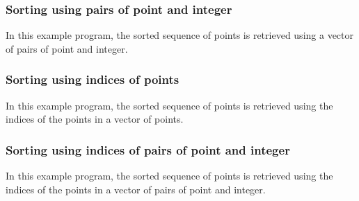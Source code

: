 \subsubsection{Sorting using pairs of point and integer}
\label{sec:sort_any_type_2}
In this example program, the sorted sequence of points is retrieved 
using a vector of pairs of point and integer.

\subsubsection{Sorting using indices of points}
In this example program, the sorted sequence of points is retrieved 
using the indices of the points in a vector of points.

\subsubsection{Sorting using indices of pairs of point and integer}
In this example program, the sorted sequence of points is retrieved 
using the indices of the points in a vector of pairs of point and integer.



